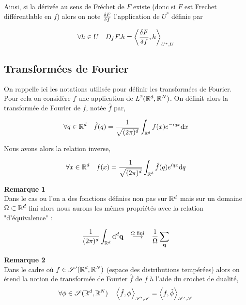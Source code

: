 \documentclass[10pt]{article}
\begin{document}
\begin{multicols}{2}
Ainsi, si la dérivée au sens de Fréchet de $F$ existe (donc si $F$ est Frechet différentlable en $f$) alors on note $\frac{\delta F}{\delta f}$ l'application de $U^*$ définie par 

\begin{equation}
  \forall h \in U \quad D_fF.h = \left< \frac{\delta F}{\delta f}, h \right>_{U^*, U}
\end{equation}

\vspace*{11pt}



\subsection{Transformées de Fourier}

On rappelle ici les notations utilisée pour définir les transformées de Fourier. Pour cela on considère $f$ une application de $L^2(\mathbb{R}^d, \mathbb{R}^N)$. On définit alors la transformée de Fourier de $f$, notée $\hat{f}$ par, 

\begin{equation}
  \forall q \in \mathbb{R}^d \quad \hat{f}(q) = \frac{1}{\sqrt{(2\pi)^d}}\int_{\mathbb{R}^d} f(x) e^{-iqx}\text{d} x
\end{equation}

Nous avons alors la relation inverse,

\begin{equation}
  \forall x \in \mathbb{R}^d \quad f(x) = \frac{1}{\sqrt{(2\pi)^d}}\int_{\mathbb{R}^d} \hat{f}(q) e^{iqx}\text{d} q
\end{equation}

\textbf{Remarque 1} \\
Dans le cas ou l'on a des fonctions définies non pas sur $\mathbb{R}^d$ mais sur un domaine $\Omega \subset \mathbb{R}^d$ fini alors nous aurons les  mêmes propriétés avec la relation "d'équivalence" : 

\begin{equation}
  \frac{1}{(2\pi)^d} \int_{\mathbb{R}^d} \text{d}^d {\bf q} \overset{\text{$\Omega$ fini}}{\quad \longrightarrow \quad } \frac{1}{\Omega} \sum_{{\bf q}}
\end{equation}


\textbf{Remarque 2} \\
Dans le cadre où $f \in \mathscr{S}'(\mathbb{R}^d, \mathbb{R}^N)$ (espace des distributions tempérées) alors on étend la notion de transformée de Fourier $\hat{f}$ de $f$ à l'aide du crochet de dualité, 
\begin{equation}
  \forall \phi \in \mathscr{S}(\mathbb{R}^d, \mathbb{R}^N) \quad \left< \hat{f}, \phi \right>_{\mathscr{S}', \mathscr{S}} = \left< f, \hat{\phi} \right>_{\mathscr{S}', \mathscr{S}}
\end{equation}


\end{multicols}
\end{document}

